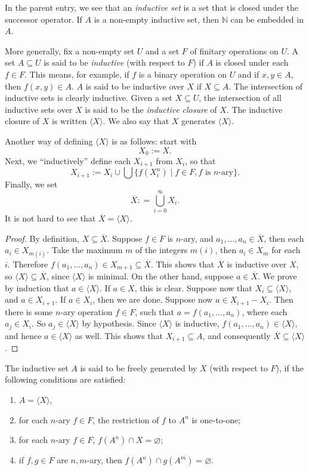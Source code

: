 \documentclass[12pt]{article}
\begin{document}
In the parent entry, we see that an \emph{inductive set} is a set that is closed under the successor operator.  If $A$ is a non-empty inductive set, then $\mathbb{N}$ can be embedded in $A$.  

More generally, fix a non-empty set $U$ and a set $F$ of finitary operations on $U$.  A set $A\subseteq U$ is said to be \emph{inductive} (with respect to $F$) if $A$ is closed under each $f\in F$.  This means, for example, if $f$ is a binary operation on $U$ and if $x,y\in A$, then $f(x,y)\in A$.  $A$ is said to be inductive over $X$ if $X\subseteq A$.  The intersection of inductive sets is clearly inductive.  Given a set $X\subseteq U$, the intersection of all inductive sets over $X$ is said to be the \emph{inductive closure} of $X$.  The inductive closure of $X$ is written $\langle X\rangle$.  We also say that $X$ generates $\langle X\rangle$.  

Another way of defining $\langle X\rangle$ is as follows: start with $$X_0 :=X.$$  Next, we ``inductively'' define each $X_{i+1}$ from $X_i$, so that $$X_{i+1}:= X_i \cup \bigcup \lbrace f(X_i^n)\mid f\in F, f \mbox{ is } n\mbox{-ary}\rbrace.$$  Finally, we set $$\overline{X}: = \bigcup_{i=0}^{\infty} X_i.$$  It is not hard to see that $\overline{X}=\langle X\rangle$.
\begin{proof}  By definition, $X\subseteq \overline{X}$.  Suppose $f\in F$ is $n$-ary, and $a_1,\ldots, a_n\in \overline{X}$, then each $a_i \in X_{m(i)}$.  Take the maximum $m$ of the integers $m(i)$, then $a_i \in X_m$ for each $i$.  Therefore $f(a_1,\ldots, a_n) \in X_{m+1} \subseteq \overline{X}$.  This shows that $\overline{X}$ is inductive over $X$, so $\langle X\rangle \subseteq \overline{X}$, since $\langle X\rangle$ is minimal.  On the other hand, suppose $a\in \overline{X}$.  We prove by induction that $a\in \langle X\rangle$.  If $a\in X$, this is clear.  Suppose now that $X_i\subseteq \langle X\rangle$, and $a\in X_{i+1}$.  If $a\in X_i$, then we are done.  Suppose now $a\in X_{i+1}-X_i$.  Then there is some $n$-ary operation $f\in F$, such that $a=f(a_1,\ldots, a_n)$, where each $a_j\in X_i$.  So $a_j\in \langle X\rangle$ by hypothesis.  Since $\langle X\rangle$ is inductive, $f(a_1,\ldots, a_n) \in \langle X\rangle$, and hence $a\in \langle X\rangle$ as well.  This shows that $X_{i+1}\subseteq A$, and consequently $\overline{X} \subseteq \langle X\rangle$.
\end{proof}

The inductive set $A$ is said to be freely generated by $X$ (with respect to $F$), if the following conditions are satisfied:
\begin{enumerate}
\item $A=\langle X\rangle$,
\item for each $n$-ary $f\in F$, the restriction of $f$ to $A^n$ is one-to-one;
\item for each $n$-ary $f\in F$, $f(A^n)\cap X=\varnothing$;
\item if $f,g\in F$ are $n,m$-ary, then $f(A^n)\cap g(A^m)=\varnothing$.
\end{enumerate}
\end{document}
